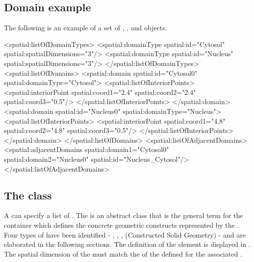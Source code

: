 \subsection{Domain example}
\label{domain-example}
The following is an example of a set of \Domain, \DomainType, and \AdjacentDomains objects.

\begin{example}
  <spatial:listOfDomainTypes>
    <spatial:domainType spatial:id="Cytosol" spatial:spatialDimensions="3"/>
    <spatial:domainType spatial:id="Nucleus" spatial:spatialDimensions="3"/>
  </spatial:listOfDomainTypes>
  <spatial:listOfDomains>
    <spatial:domain spatial:id="Cytosol0" spatial:domainType="Cytosol">
      <spatial:listOfInteriorPoints>
        <spatial:interiorPoint spatial:coord1="2.4" spatial:coord2="2.4" spatial:coord3="0.5"/>
      </spatial:listOfInteriorPoints>
    </spatial:domain>
    <spatial:domain spatial:id="Nucleus0" spatial:domainType="Nucleus">
      <spatial:listOfInteriorPoints>
        <spatial:interiorPoint spatial:coord1="4.8" spatial:coord2="4.8" spatial:coord3="0.5"/>
      </spatial:listOfInteriorPoints>
    </spatial:domain>
  </spatial:listOfDomains>
  <spatial:listOfAdjacentDomains>
    <spatial:adjacentDomains spatial:domain1="Cytosol0" spatial:domain2="Nucleus0"
                             spatial:id="Nucleus_Cytosol"/>
  </spatial:listOfAdjacentDomains>
\end{example}


\subsection{The  class}
\label{geometrydefinition-class}
A \Geometry can specify a list of \GeometryDefinitions. The \GeometryDefinition is an abstract class that is the general term for the container which defines the concrete geometric constructs represented by the \Geometry. Four types of \GeometryDefinitions have been identified - \AnalyticGeometry, \SampledFieldGeometry, \ParametricGeometry, \CSGeometry (Constructed Solid Geometry) - and are elaborated in the following sections. The definition of the \GeometryDefinition element is displayed in .  The spatial dimension of the \GeometryDefinition must match the  of the \DomainType defined for the associated \Domain.

